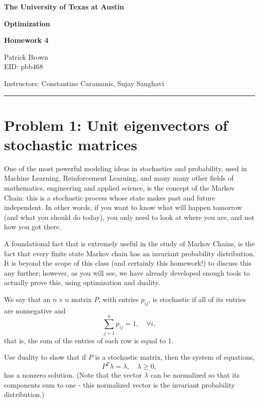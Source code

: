 \documentclass{article}
\begin{document}
\begin{center}
    \large\textbf{The University of Texas at Austin}
    
    \huge\textbf{Optimization}
    
    \Large\textbf{Homework 4}
    
    \vspace{0.5cm}
    
    \large
    Patrick Brown \\
    EID: pbb468
    
    \vspace{0.5cm}
    
    \normalsize
    Instructors: Constantine Caramanis, Sujay Sanghavi
\end{center}

\hrule

\vspace{1cm}

\section*{Problem 1: Unit eigenvectors of stochastic matrices}

One of the most powerful modeling ideas in stochastics and probability, used in Machine Learning, Reinforcement Learning, and many many other fields of mathematics, engineering and applied science, is the concept of the Markov Chain: this is a stochastic process whose state makes past and future independent. In other words, if you want to know what will happen tomorrow (and what you should do today), you only need to look at where you are, and not how you got there.

A foundational fact that is extremely useful in the study of Markov Chains, is the fact that every finite state Markov chain has an invariant probability distribution. It is beyond the scope of this class (and certainly this homework!) to discuss this any further; however, as you will see, we have already developed enough tools to actually prove this, using optimization and duality.

We say that an $n \times n$ matrix $P$, with entries $p_{ij}$, is stochastic if all of its entries are nonnegative and
\[
\sum_{j=1}^n p_{ij} = 1, \quad \forall i,
\]
that is, the sum of the entries of each row is equal to 1.

Use duality to show that if $P$ is a stochastic matrix, then the system of equations,
\[
P^T \lambda = \lambda, \quad \lambda \geq 0,
\]
has a nonzero solution. (Note that the vector $\lambda$ can be normalized so that its components sum to one - this normalized vector is the invariant probability distribution.)
\end{document}
